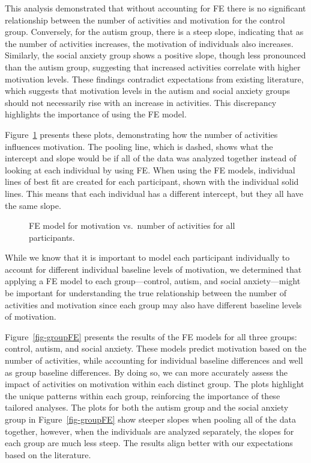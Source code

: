 \documentclass[
  letterpaper,
  number,
  review,
  3p]{elsarticle}
\begin{document}
This analysis demonstrated that without accounting for FE there is no
significant relationship between the number of activities and motivation
for the control group. Conversely, for the autism group, there is a
steep slope, indicating that as the number of activities increases, the
motivation of individuals also increases. Similarly, the social anxiety
group shows a positive slope, though less pronounced than the autism
group, suggesting that increased activities correlate with higher
motivation levels. These findings contradict expectations from existing
literature, which suggests that motivation levels in the autism and
social anxiety groups should not necessarily rise with an increase in
activities. This discrepancy highlights the importance of using the FE
model.

Figure~\ref{fig-FEAnaly} presents these plots, demonstrating how the
number of activities influences motivation. The pooling line, which is
dashed, shows what the intercept and slope would be if all of the data
was analyzed together instead of looking at each individual by using FE.
When using the FE models, individual lines of best fit are created for
each participant, shown with the individual solid lines. This means that
each individual has a different intercept, but they all have the same
slope.

\begin{figure}[H]


\caption{\label{fig-FEAnaly}FE model for motivation vs.~number of
activities for all participants.}

\end{figure}%

While we know that it is important to model each participant
individually to account for different individual baseline levels of
motivation, we determined that applying a FE model to each
group---control, autism, and social anxiety---might be important for
understanding the true relationship between the number of activities and
motivation since each group may also have different baseline levels of
motivation.

Figure~\ref{fig-groupFE} presents the results of the FE models for all
three groups: control, autism, and social anxiety. These models predict
motivation based on the number of activities, while accounting for
individual baseline differences and well as group baseline differences.
By doing so, we can more accurately assess the impact of activities on
motivation within each distinct group. The plots highlight the unique
patterns within each group, reinforcing the importance of these tailored
analyses. The plots for both the autism group and the social anxiety
group in Figure~\ref{fig-groupFE} show steeper slopes when pooling all
of the data together, however, when the individuals are analyzed
separately, the slopes for each group are much less steep. The results
align better with our expectations based on the literature.
\end{document}
